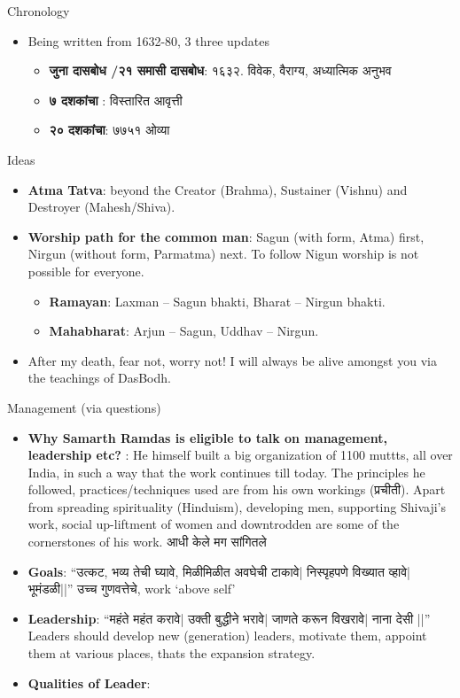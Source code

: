 Chronology

\begin{itemize}[noitemsep,nolistsep]
\item Being written from 1632-80, 3 three updates
	\begin{itemize}[noitemsep,nolistsep]
	\item \textbf{जुना दासबोध /२१ समासी दासबोध}: १६३२. विवेक, वैराग्य, अध्यात्मिक अनुभव 
	\item  \textbf{७ दशकांचा }: विस्तारित आवृत्ती 
	\item \textbf{२० दशकांचा}: ७७५१ ओव्या
	\end{itemize}

\end{itemize}

Ideas
\begin{itemize}[noitemsep,nolistsep]
\item \textbf{Atma Tatva}: beyond the Creator (Brahma), Sustainer (Vishnu) and Destroyer (Mahesh/Shiva).
\item  \textbf{Worship path for the common man}: Sagun (with form, Atma) first, Nirgun (without form, Parmatma) next. To follow Nigun worship is not possible for everyone.
	\begin{itemize}[noitemsep,nolistsep]
	\item \textbf{Ramayan}: Laxman – Sagun bhakti, Bharat – Nirgun bhakti.
	\item  \textbf{Mahabharat}: Arjun – Sagun, Uddhav – Nirgun.
	\end{itemize}
\item After my death, fear not, worry not! I will always be alive amongst you via the teachings of DasBodh.	
\end{itemize}

Management (via questions)
\begin{itemize}[noitemsep,nolistsep]
\item \textbf{Why Samarth Ramdas is eligible to talk on management, leadership etc?} : He himself built a big organization of 1100 muttts, all over India, in such a way that the work  continues till today. The principles he followed, practices/techniques used are from his own workings (प्रचीती). Apart from spreading spirituality (Hinduism), developing men, supporting Shivaji's work, social up-liftment of women and downtrodden are some of the cornerstones of his work. आधी केले मग सांगितले 
\item  \textbf{Goals}: ``उत्कट, भव्य तेची घ्यावे, मिळीमिळीत अवघेची टाकावे| निस्पृहपणे विख्यात व्हावे| भूमंडळी||''  उच्च गुणवत्तेचे, work `above self'
\item \textbf{Leadership}: ``महंते महंत करावे| उक्ती बुद्धीने भरावे| जाणते करून विखरावे| नाना देसी ||'' Leaders should develop new (generation) leaders, motivate them, appoint them at various places, thats the expansion strategy.
\item \textbf{Qualities of Leader}: 
\end{itemize}
